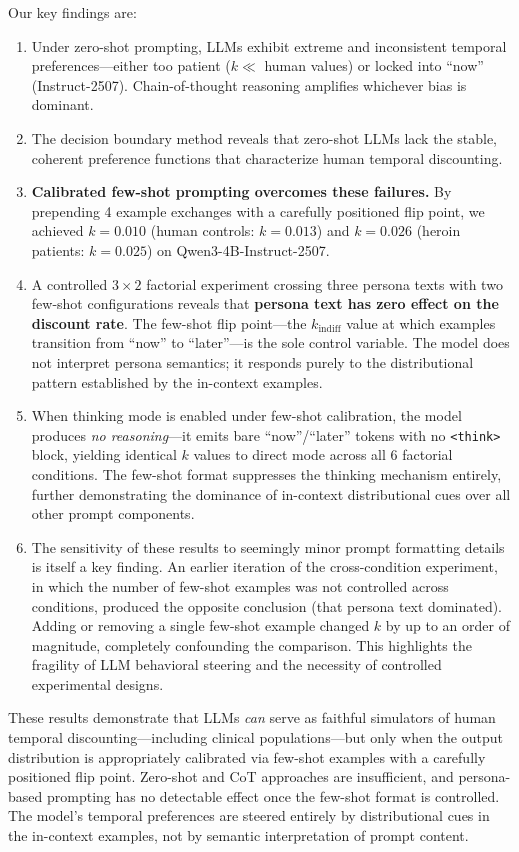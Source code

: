 \documentclass[11pt,a4paper]{article}
\begin{document}
Our key findings are:
\begin{enumerate}
    \item Under zero-shot prompting, LLMs exhibit extreme and inconsistent temporal preferences---either too patient ($k \ll$ human values) or locked into ``now'' (Instruct-2507). Chain-of-thought reasoning amplifies whichever bias is dominant.
    \item The decision boundary method reveals that zero-shot LLMs lack the stable, coherent preference functions that characterize human temporal discounting.
    \item \textbf{Calibrated few-shot prompting overcomes these failures.} By prepending 4 example exchanges with a carefully positioned flip point, we achieved $k = 0.010$ (human controls: $k = 0.013$) and $k = 0.026$ (heroin patients: $k = 0.025$) on Qwen3-4B-Instruct-2507.
    \item A controlled $3 \times 2$ factorial experiment crossing three persona texts with two few-shot configurations reveals that \textbf{persona text has zero effect on the discount rate}. The few-shot flip point---the $k_{\text{indiff}}$ value at which examples transition from ``now'' to ``later''---is the sole control variable. The model does not interpret persona semantics; it responds purely to the distributional pattern established by the in-context examples.
    \item When thinking mode is enabled under few-shot calibration, the model produces \emph{no reasoning}---it emits bare ``now''/``later'' tokens with no \texttt{<think>} block, yielding identical $k$ values to direct mode across all 6 factorial conditions. The few-shot format suppresses the thinking mechanism entirely, further demonstrating the dominance of in-context distributional cues over all other prompt components.
    \item The sensitivity of these results to seemingly minor prompt formatting details is itself a key finding. An earlier iteration of the cross-condition experiment, in which the number of few-shot examples was not controlled across conditions, produced the opposite conclusion (that persona text dominated). Adding or removing a single few-shot example changed $k$ by up to an order of magnitude, completely confounding the comparison. This highlights the fragility of LLM behavioral steering and the necessity of controlled experimental designs.
\end{enumerate}

These results demonstrate that LLMs \emph{can} serve as faithful simulators of human temporal discounting---including clinical populations---but only when the output distribution is appropriately calibrated via few-shot examples with a carefully positioned flip point. Zero-shot and CoT approaches are insufficient, and persona-based prompting has no detectable effect once the few-shot format is controlled. The model's temporal preferences are steered entirely by distributional cues in the in-context examples, not by semantic interpretation of prompt content.
\end{document}

